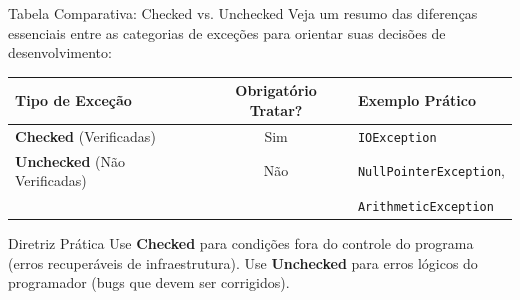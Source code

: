 \documentclass[9pt]{beamer}
\begin{document}
\begin{frame}{Tabela Comparativa: Checked vs. Unchecked}
    Veja um resumo das diferenças essenciais entre as categorias de exceções para orientar suas decisões de desenvolvimento:
    
    \vspace{0.4cm}
    
    \begin{center}
    \renewcommand{\arraystretch}{1.4}
    \begin{tabular}{|l|c|l|}
        \hline
        \textbf{Tipo de Exceção} & \textbf{Obrigatório Tratar?} & \textbf{Exemplo Prático} \\
        \hline
        \textbf{Checked} (Verificadas) & Sim & \texttt{IOException} \\
        \hline
        \textbf{Unchecked} (Não Verificadas) & Não & \texttt{NullPointerException},\\& & \texttt{ArithmeticException} \\
        \hline
    \end{tabular}
    \end{center}
    
    \vspace{0.4cm}
    
    \begin{block}{Diretriz Prática}
        \small
        Use \textbf{Checked} para condições fora do controle do programa (erros recuperáveis de infraestrutura). Use \textbf{Unchecked} para erros lógicos do programador (bugs que devem ser corrigidos).
    \end{block}
\end{frame}
\end{document}
